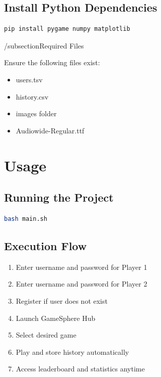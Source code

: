 \documentclass[12pt,a4paper]{article}
\begin{document}
\subsection{Install Python Dependencies}

\begin{lstlisting}[language=bash]
pip install pygame numpy matplotlib
\end{lstlisting}

/subsection{Required Files}

Ensure the following files exist:

\begin{itemize}
    \item users.tsv
    \item history.csv
    \item images folder
    \item Audiowide-Regular.ttf
\end{itemize}


\section{Usage}

\subsection{Running the Project}

\begin{lstlisting}[language=bash]
bash main.sh
\end{lstlisting}

\subsection{Execution Flow}

\begin{enumerate}
    \item Enter username and password for Player 1
    \item Enter username and password for Player 2
    \item Register if user does not exist
    \item Launch GameSphere Hub
    \item Select desired game
    \item Play and store history automatically
    \item Access leaderboard and statistics anytime
\end{enumerate}
\end{document}
